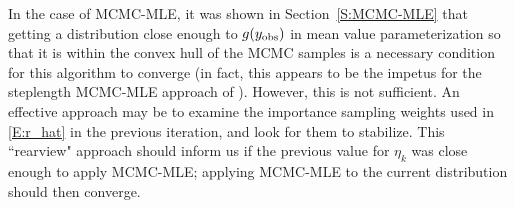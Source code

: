 In the case of MCMC-MLE, it was shown in Section~\ref{S:MCMC-MLE} that getting 
a distribution close enough to $g(y_{\text{obs}})$ in mean value parameterization 
so that it is within the convex hull of the MCMC samples is a 
necessary condition for this algorithm to converge (in fact, this appears to be the
impetus for the steplength MCMC-MLE approach of \citet{Hummel}).  However, this is not
sufficient.  An effective approach may be to examine the importance sampling weights
used in \eqref{E:r_hat} in the previous iteration, and look for them to stabilize.
This ``rearview" approach should inform us if the previous value for $\eta_k$ 
was close enough to apply MCMC-MLE; applying MCMC-MLE to the current distribution
should then converge.
%
